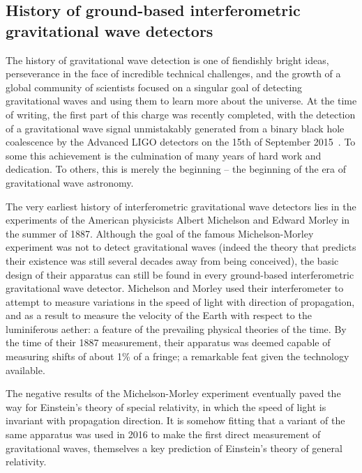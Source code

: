 \newpage
\subsection{History of ground-based interferometric gravitational wave detectors}\label{subsec:prehistory}
The history of gravitational wave detection is one of fiendishly bright ideas, perseverance in the face of incredible 
technical challenges, and the growth of a global community of scientists focused on a singular goal of detecting 
gravitational waves and using them to learn more about the universe. At the time of writing, the first part of this 
charge was recently completed, with the detection of a gravitational wave signal unmistakably generated from a binary 
black hole coalescence by the Advanced LIGO detectors on the 15th of September 2015~\cite{GW150914}. To 
some this achievement is the culmination of many years of hard work and dedication. To others, this is merely 
the beginning – the beginning of the era of gravitational wave astronomy. 

The very earliest history of interferometric gravitational wave detectors lies in the experiments 
of the American physicists Albert Michelson and Edward Morley in the summer of 1887. Although 
the goal of the famous Michelson-Morley experiment was not to detect gravitational waves (indeed 
the theory that predicts their existence was still several decades away from being conceived), the basic 
design of their apparatus can still be found in every ground-based interferometric gravitational wave detector. 
Michelson and Morley used their interferometer to attempt to measure variations in the speed of 
light with direction of propagation, and as a result to measure the velocity of the Earth with respect to the 
luminiferous aether: a feature of the prevailing physical theories of the time. By the time of their 1887 measurement, 
their apparatus was deemed capable of measuring shifts of about 1\% of a fringe; a remarkable feat given the 
technology available. 

The negative results of the Michelson-Morley experiment eventually paved the way for Einstein's theory of special 
relativity, in which the speed of light is invariant with propagation direction. It is somehow fitting that a variant 
of the same apparatus was used in 2016 to make the first direct measurement of gravitational waves, themselves 
a key prediction of Einstein's theory of general relativity. 

